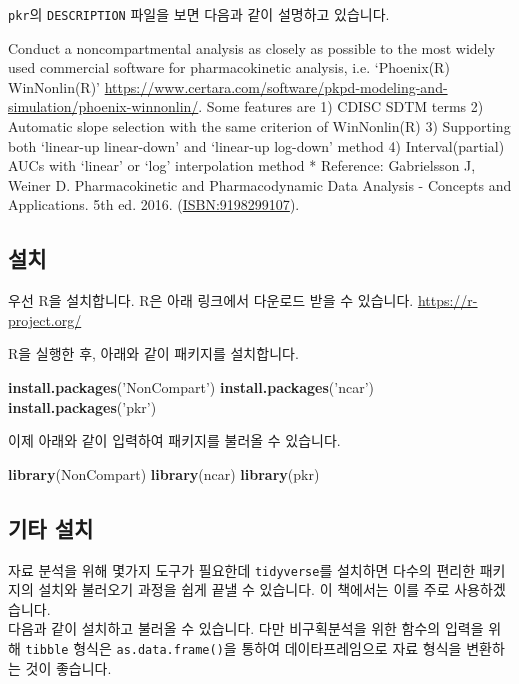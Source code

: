 \documentclass[]{krantz}
\makeatletter
\newenvironment{Shaded}{\begin{snugshade}}{\end{snugshade}}
\newcommand{\KeywordTok}[1]{\textcolor[rgb]{0.13,0.29,0.53}{\textbf{#1}}}
\newcommand{\StringTok}[1]{\textcolor[rgb]{0.31,0.60,0.02}{#1}}
\newcommand{\NormalTok}[1]{#1}
\renewenvironment{quote}{\begin{VF}}{\end{VF}}
\newenvironment{kframe}{%
\medskip{}
\setlength{\fboxsep}{.8em}
 \def\at@end@of@kframe{}%
 \ifinner\ifhmode%
  \def\at@end@of@kframe{\end{minipage}}%
  \begin{minipage}{\columnwidth}%
 \fi\fi%
 \def\FrameCommand##1{\hskip\@totalleftmargin \hskip-\fboxsep
 \colorbox{shadecolor}{##1}\hskip-\fboxsep
     \hskip-\linewidth \hskip-\@totalleftmargin \hskip\columnwidth}%
 \MakeFramed {\advance\hsize-\width
   \@totalleftmargin\z@ \linewidth\hsize
   \@setminipage}}%
 {\par\unskip\endMakeFramed%
 \at@end@of@kframe}
\renewenvironment{Shaded}{\begin{kframe}}{\end{kframe}}
\theoremstyle{definition}
\theoremstyle{definition}
\theoremstyle{definition}
\theoremstyle{remark}
\makeatother
\begin{document}
\texttt{pkr}의 \texttt{DESCRIPTION} 파일을 보면 다음과 같이 설명하고
있습니다.

\begin{quote}
Conduct a noncompartmental analysis as closely as possible to the most
widely used commercial software for pharmacokinetic analysis, i.e.
`Phoenix(R) WinNonlin(R)'
\url{https://www.certara.com/software/pkpd-modeling-and-simulation/phoenix-winnonlin/}.
Some features are 1) CDISC SDTM terms 2) Automatic slope selection with
the same criterion of WinNonlin(R) 3) Supporting both `linear-up
linear-down' and `linear-up log-down' method 4) Interval(partial) AUCs
with `linear' or `log' interpolation method * Reference: Gabrielsson J,
Weiner D. Pharmacokinetic and Pharmacodynamic Data Analysis - Concepts
and Applications. 5th ed. 2016. (\url{ISBN:9198299107}).
\end{quote}

\subsection{설치}

우선 R을 설치합니다. R은 아래 링크에서 다운로드 받을 수 있습니다.
\url{https://r-project.org/}

R을 실행한 후, 아래와 같이 패키지를 설치합니다.

\begin{Shaded}
\begin{Highlighting}[]
\KeywordTok{install.packages}\NormalTok{(}\StringTok{'NonCompart'}\NormalTok{)}
\KeywordTok{install.packages}\NormalTok{(}\StringTok{'ncar'}\NormalTok{)}
\KeywordTok{install.packages}\NormalTok{(}\StringTok{'pkr'}\NormalTok{)}
\end{Highlighting}
\end{Shaded}

이제 아래와 같이 입력하여 패키지를 불러올 수 있습니다.

\begin{Shaded}
\begin{Highlighting}[]
\KeywordTok{library}\NormalTok{(NonCompart)}
\KeywordTok{library}\NormalTok{(ncar)}
\KeywordTok{library}\NormalTok{(pkr)}
\end{Highlighting}
\end{Shaded}

\subsection{기타 설치}\label{-}

자료 분석을 위해 몇가지 도구가 필요한데
\texttt{tidyverse}\citep{R-tidyverse}를 설치하면 다수의 편리한
패키지\citep{R-tidyr, R-dplyr, R-tibble, R-ggplot2, R-purrr, R-readr}의
설치와 불러오기 과정을 쉽게 끝낼 수 있습니다. 이 책에서는 이를 주로
사용하겠습니다.\\
다음과 같이 설치하고 불러올 수 있습니다. 다만 비구획분석을 위한 함수의
입력을 위해 \texttt{tibble} 형식은 \texttt{as.data.frame()}을 통하여
데이타프레임으로 자료 형식을 변환하는 것이 좋습니다.
\end{document}
